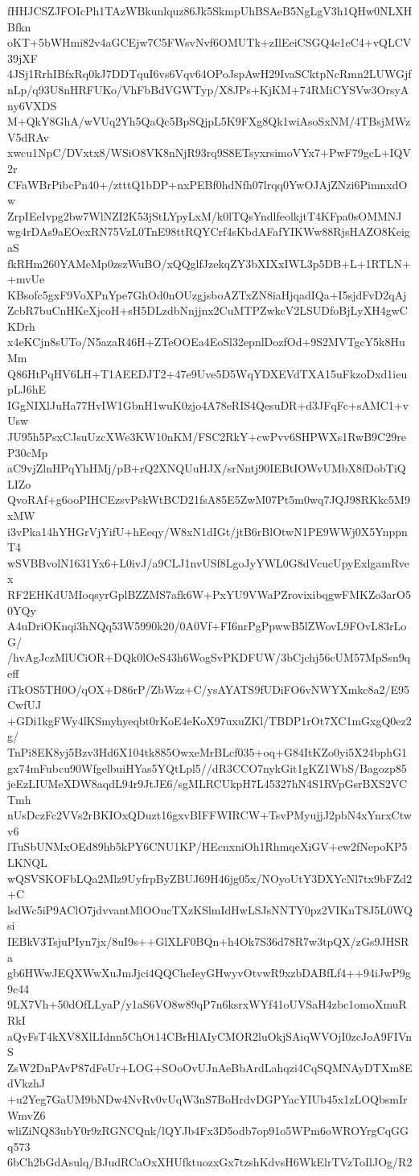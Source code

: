 fHHJCSZJFOIcPh1TAzWBkunlquz86Jk5SkmpUhBSAeB5NgLgV3h1QHw0NLXHBfkn
oKT+5bWHmi82v4aGCEjw7C5FWsvNvf6OMUTk+zIlEeiCSGQ4e1eC4+vQLCV39jXF
4JSj1RrhIBfxRq0kJ7DDTquI6vs6Vqv64OPoJspAwH29IvaSCktpNcRmn2LUWGjf
nLp/q93U8nHRFUKo/VhFbBdVGWTyp/X8JPs+KjKM+74RMiCYSVw3OrsyAny6VXDS
M+QkY8GhA/wVUq2Yh5QaQc5BpSQjpL5K9FXg8Qk1wiAsoSxNM/4TBsjMWzV5dRAv
xwcu1NpC/DVxtx8/WSiO8VK8nNjR93rq9S8ETsyxrsimoVYx7+PwF79gcL+IQV2r
CFaWBrPibcPn40+/ztttQ1bDP+nxPEBf0hdNfh07lrqq0YwOJAjZNzi6PimnxdOw
ZrpIEeIvpg2bw7WlNZI2K53jStLYpyLxM/k0lTQsYndlfeolkjtT4KFpa0sOMMNJ
wg4rDAs9aEOexRN75VzL0TnE98ttRQYCrf4sKbdAFafYIKWw88RjsHAZO8KeigaS
fkRHm260YAMeMp0zszWuBO/xQQglfJzekqZY3bXIXxIWL3p5DB+L+1RTLN++mvUe
KBsofc5gxF9VoXPnYpe7GhOd0nOUzgjsboAZTxZN8iaHjqadIQa+I5sjdFvD2qAj
ZcbR7buCnHKeXjcoH+sH5DLzdbNnjjnx2CuMTPZwkcV2LSUDfoBjLyXH4gwCKDrh
x4eKCjn8sUTo/N5azaR46H+ZTeOOEa4EoSl32epnlDozfOd+9S2MVTgcY5k8HuMm
Q86HtPqHV6LH+T1AEEDJT2+47e9Uve5D5WqYDXEVdTXA15uFkzoDxd1ieupLJ6hE
IGgNIXlJuHa77HvIW1GbnH1wuK0zjo4A78eRIS4QesuDR+d3JFqFc+sAMC1+vUsw
JU95h5PsxCJsuUzcXWe3KW10nKM/FSC2RkY+cwPvv6SHPWXs1RwB9C29reP30cMp
aC9vjZlnHPqYhHMj/pB+rQ2XNQUuHJX/srNntj90IEBtIOWvUMbX8fDobTiQLIZo
QvoRAf+g6ooPIHCEzsvPskWtBCD21fsA85E5ZwM07Pt5m0wq7JQJ98RKkc5M9xMW
i3vPka14hYHGrVjYifU+hEeqy/W8xN1dIGt/jtB6rBlOtwN1PE9WWj0X5YnppnT4
wSVBBvolN1631Yx6+L0ivJ/a9CLJ1nvUSf8LgoJyYWL0G8dVcucUpyExlgamRvex
RF2EHKdUMIoqsyrGplBZZMS7afk6W+PxYU9VWaPZrovixibqgwFMKZo3arO50YQy
A4uDriOKnqi3hNQq53W5990k20/0A0Vf+FI6nrPgPpwwB5lZWovL9FOvL83rLoG/
/hvAgJczMlUCiOR+DQk0lOeS43h6WogSvPKDFUW/3bCjchj56cUM57MpSsn9qeff
iTkOS5TH0O/qOX+D86rP/ZbWzz+C/ysAYATS9fUDiFO6vNWYXmkc8a2/E95CwfUJ
+GDi1kgFWy4lKSmyhyeqbt0rKoE4eKoX97uxuZKl/TBDP1rOt7XC1mGxgQ0ez2g/
TnPi8EK8yj5Bzv3Hd6X104tk885OwxeMrBLcf035+oq+G84ItKZo0yi5X24bphG1
gx74mFubcu90WfgelbuiHYas5YQtLpl5//dR3CCO7nykGit1gKZ1WbS/Bagozp85
jeEzLIUMeXDW8aqdL94r9JtJE6/sgMLRCUkpH7L45327hN4S1RVpGsrBXS2VCTmh
nUsDczFc2VVs2rBKIOxQDuzt16gxvBIFFWIRCW+TsvPMyujjJ2pbN4xYnrxCtwv6
lTuSbUNMxOEd89hb5kPY6CNU1KP/HEcnxniOh1RhmqeXiGV+ew2fNepoKP5LKNQL
wQSVSKOFbLQa2Mlz9UyfrpByZBUJ69H46jg05x/NOyoUtY3DXYcNl7tx9bFZd2+C
lsdWc5iP9AClO7jdvvantMlOOucTXzKSlmIdHwLSJsNNTY0pz2VIKnT8J5L0WQsi
IEBkV3TsjuPIyn7jx/8uI9s++GlXLF0BQn+h4Ok7S36d78R7w3tpQX/zGs9JHSRa
gb6HWwJEQXWwXuJmJjci4QQCheIeyGHwyvOtvwR9xzbDABfLf4++94iJwP9g9c44
9LX7Vh+50dOfLLyaP/y1aS6VO8w89qP7n6ksrxWYf41oUVSaH4zbc1omoXmuRRkI
aQvFsT4kXV8XlLIdnn5ChOt14CBrHlAIyCMOR2luOkjSAiqWVOjI0zcJoA9FIVnS
ZsW2DnPAvP87dFeUr+LOG+SOoOvUJnAeBbArdLahqzi4CqSQMNAyDTXm8EdVkzhJ
+u2Yeg7GaUM9bNDw4NvRv0vUqW3nS7BoHrdvDGPYacYIUb45x1zLOQbsmIrWmvZ6
wliZiNQ83ubY0r9zRGNCQnk/lQYJb4Fx3D5odb7op91o5WPm6oWROYrgCqGGq573
6bCh2bGdAsulq/BJudRCaOxXHUfktuozxGx7tzshKdvsH6WkElrTVzToIlJOg/R2
